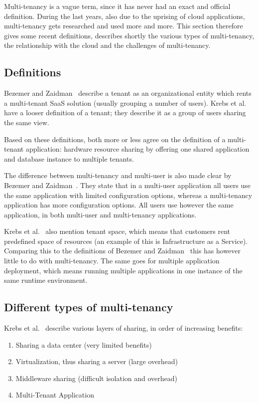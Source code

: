 Multi-tenancy is a vague term, since it has never had an exact and official definition. During the last years, also due to the uprising of cloud applications, multi-tenancy gets researched and used more and more. This section therefore gives some recent definitions, describes shortly the various types of multi-tenancy, the relationship with the cloud and the challenges of multi-tenancy.

\subsection{Definitions}

Bezemer and Zaidman~\cite{bezemer2010multi} describe a tenant as an organizational entity which rents a multi-tenant SaaS solution (usually grouping a number of users). Krebs et al.~\cite{krebs2012architecture} have a looser definition of a tenant; they describe it as a group of users sharing the same view.

Based on these definitions, both more or less agree on the definition of a multi-tenant application: hardware resource sharing by offering one shared application and database instance to multiple tenants.

The difference between multi-tenancy and multi-user is also made clear by Bezemer and Zaidman~\cite{bezemer2010multi}. They state that in a multi-user application all users use the same application with limited configuration options, whereas a multi-tenancy application has more configuration options. All users use however the same application, in both multi-user and multi-tenancy applications.

Krebs et al.~\cite{krebs2012architecture} also mention tenant space, which means that customers rent predefined space of resources (an example of this is Infrastructure as a Service). Comparing this to the definitions of Bezemer and Zaidman~\cite{bezemer2010multi} this has however little to do with multi-tenancy. The same goes for multiple application deployment, which means running multiple applications in one instance of the same runtime environment.

\subsection{Different types of multi-tenancy}

Krebs et al.~\cite{krebs2012architecture} describe various layers of sharing, in order of increasing benefits:
\begin{enumerate}
\item Sharing a data center (very limited benefits)
\item Virtualization, thus sharing a server (large overhead)
\item Middleware sharing (difficult isolation and overhead)
\item Multi-Tenant Application
\end{enumerate}

